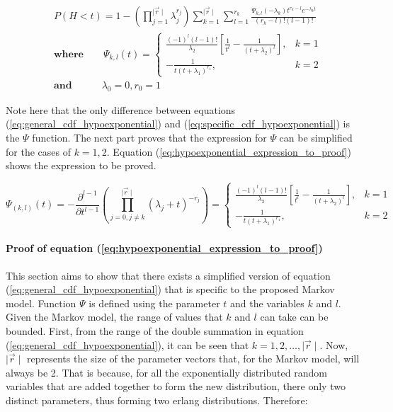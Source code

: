\begin{align} \label{eq:specific_cdf_hypoexponential}
    & P(H < t) = 1 - \left( \prod_{j=1}^{\mid \vec{r} \mid} \lambda_j^{r_j} \right) 
    \sum_{k=1}^{\mid \vec{r} \mid} \sum_{l=1}^{r_k} \frac{\Psi_{k,l}(-\lambda_k)t^{r_k - l} 
    e^{-\lambda_k t}}{(r_k - l)! (l - 1)!} \nonumber \\ 
    & \textbf{where} \qquad \Psi_{k,l}(t) = 
    \begin{cases} 
        \frac{(-1)^{l} (l-1)!}{\lambda_2} \left[\frac{1}{t^l} - \frac{1}
        {(t + \lambda_2)^l}\right] , & k=1 \\
        - \frac{1}{t (t + \lambda_1)^{r_1}}, & k=2
    \end{cases} \nonumber \\
    & \textbf{and} \quad \qquad \lambda_0 = 0, r_0 = 1
\end{align}

Note here that the only difference between equations
(\ref{eq:general_cdf_hypoexponential}) and (\ref{eq:specific_cdf_hypoexponential}) 
is the \(\Psi\) function. 
The next part proves that the expression for \(\Psi\) can be simplified for the 
cases of \(k = 1,2\). 
Equation (\ref{eq:hypoexponential_expression_to_proof}) shows the expression to 
be proved.

\begin{equation} \label{eq:hypoexponential_expression_to_proof}
    \Psi_{(k,l)}(t) = - \frac{\partial^{l - 1}}{\partial t ^{l - 1}} 
    \left( \prod_{j = 0, j \neq k}^{\mid \vec{r} \mid} (\lambda_j + t)^{-r_j} \right) = 
    \begin{cases} 
        \frac{(-1)^{l} (l-1)!}{\lambda_2} \left[\frac{1}{t^l} - \frac{1}
        {(t + \lambda_2)^l}\right] , & k=1 \\
        - \frac{1}{t (t + \lambda_1)^{r_1}}, & k=2
    \end{cases}
\end{equation}



\paragraph{Proof of equation (\ref{eq:hypoexponential_expression_to_proof})}
 
This section aims to show that there exists a simplified version of equation 
(\ref{eq:general_cdf_hypoexponential}) that is specific to the proposed Markov 
model.
Function \(\Psi\) is defined using the parameter \(t\) and the variables \(k\) 
and \(l\).
Given the Markov model, the range of values that \(k\) and \(l\) can take can be
bounded.
First, from the range of the double summation in equation 
(\ref{eq:general_cdf_hypoexponential}), it can be seen that 
\(k = 1, 2, \dots, \mid \vec{r} \mid\).
Now, \(\mid \vec{r} \mid\) represents the size of the parameter vectors that, 
for the Markov model, will always be 2. 
That is because, for all the exponentially distributed random variables that are
added together to form the new distribution, there only two distinct parameters,
thus forming two erlang distributions. Therefore:

